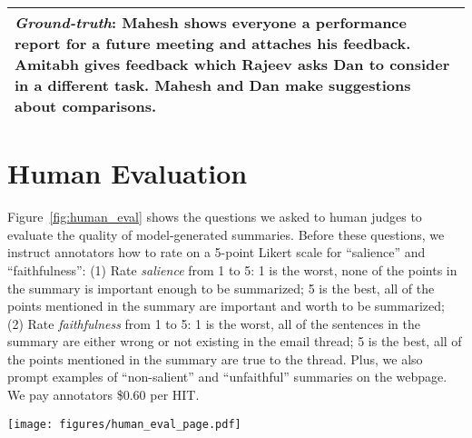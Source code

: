 \begin{table*}
\begin{center}
\begin{tabular}{p{\textwidth}}
\emph{Ground-truth}: Mahesh shows everyone a performance report for a future meeting and attaches his feedback. Amitabh gives feedback which Rajeev asks Dan to consider in a different task. Mahesh and Dan make suggestions about comparisons. \\
\bottomrule
\end{tabular}
\end{center}
\vspace{-12pt}
\caption{Examples of high-quality summaries generated by model. Emails are separated by `' and some content are omit by `...'. (\textbf{salience=xx, faithfulness=xx}) gives the average human rating for that summary.}
\vspace{-12pt}
\label{tab:high-example}
\end{table*}

\section{Human Evaluation}
\label{appendix:human}
Figure~\ref{fig:human_eval} shows the questions we asked to human judges to evaluate the quality of model-generated summaries. Before these questions, we instruct annotators how to rate on a 5-point Likert scale for ``salience'' and ``faithfulness'': (1) Rate \emph{salience} from 1 to 5: 1 is the worst, none of the points in the summary is important enough to be summarized; 5 is the best, all of the points mentioned in the summary are important and worth to be summarized; (2) Rate \emph{faithfulness} from 1 to 5: 1 is the worst, all of the sentences in the summary are either wrong or not existing in the email thread; 5 is the best, all of the points mentioned in the summary are true to the thread. Plus, we also prompt examples of ``non-salient'' and ``unfaithful'' summaries on the webpage. We pay annotators \$0.60 per HIT.


\begin{figure*}
    \centering
    \texttt{[image: figures/human\_eval\_page.pdf]}
    \vspace{-10pt}
    \caption{A part of the Amazon Mechanical Turk webpage used for human evaluation.}
    \label{fig:human_eval}
    \vspace{-12pt}
\end{figure*}

